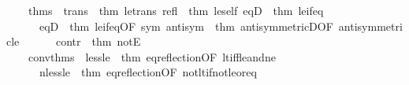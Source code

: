 \begin{isabellebody}
\ \ \ \ thms\ {\isacharequal}{\kern0pt}\ {\isacharbraceleft}{\kern0pt}trans\ {\isacharequal}{\kern0pt}\ {\isacharat}{\kern0pt}{\isacharbraceleft}{\kern0pt}thm\ le{\isacharunderscore}{\kern0pt}trans{\isacharbraceright}{\kern0pt}{\isacharcomma}{\kern0pt}\ refl\ {\isacharequal}{\kern0pt}\ {\isacharat}{\kern0pt}{\isacharbraceleft}{\kern0pt}thm\ le{\isacharunderscore}{\kern0pt}self{\isacharbraceright}{\kern0pt}{\isacharcomma}{\kern0pt}\ eqD{}\ {\isacharequal}{\kern0pt}\ {\isacharat}{\kern0pt}{\isacharbraceleft}{\kern0pt}thm\ le{\isacharunderscore}{\kern0pt}if{\isacharunderscore}{\kern0pt}eq{\isacharbraceright}{\kern0pt}{\isacharcomma}{\kern0pt}\isanewline
\ \ \ \ \ \ eqD{}\ {\isacharequal}{\kern0pt}\ {\isacharat}{\kern0pt}{\isacharbraceleft}{\kern0pt}thm\ le{\isacharunderscore}{\kern0pt}if{\isacharunderscore}{\kern0pt}eq{\isacharbrackleft}{\kern0pt}OF\ sym{\isacharbrackright}{\kern0pt}{\isacharbraceright}{\kern0pt}{\isacharcomma}{\kern0pt}\ antisym\ {\isacharequal}{\kern0pt}\ {\isacharat}{\kern0pt}{\isacharbraceleft}{\kern0pt}thm\ antisymmetricD{\isacharbrackleft}{\kern0pt}OF\ antisymmetric{\isacharunderscore}{\kern0pt}le{\isacharbrackright}{\kern0pt}{\isacharbraceright}{\kern0pt}{\isacharcomma}{\kern0pt}\isanewline
\ \ \ \ \ \ contr\ {\isacharequal}{\kern0pt}\ {\isacharat}{\kern0pt}{\isacharbraceleft}{\kern0pt}thm\ notE{\isacharbraceright}{\kern0pt}{\isacharbraceright}{\kern0pt}{\isacharcomma}{\kern0pt}\isanewline
\ \ \ \ conv{\isacharunderscore}{\kern0pt}thms\ {\isacharequal}{\kern0pt}\ {\isacharbraceleft}{\kern0pt}less{\isacharunderscore}{\kern0pt}le\ {\isacharequal}{\kern0pt}\ {\isacharat}{\kern0pt}{\isacharbraceleft}{\kern0pt}thm\ eq{\isacharunderscore}{\kern0pt}reflection{\isacharbrackleft}{\kern0pt}OF\ lt{\isacharunderscore}{\kern0pt}iff{\isacharunderscore}{\kern0pt}le{\isacharunderscore}{\kern0pt}and{\isacharunderscore}{\kern0pt}ne{\isacharbrackright}{\kern0pt}{\isacharbraceright}{\kern0pt}{\isacharcomma}{\kern0pt}\isanewline
\ \ \ \ \ \ nless{\isacharunderscore}{\kern0pt}le\ {\isacharequal}{\kern0pt}\ {\isacharat}{\kern0pt}{\isacharbraceleft}{\kern0pt}thm\ eq{\isacharunderscore}{\kern0pt}reflection{\isacharbrackleft}{\kern0pt}OF\ not{\isacharunderscore}{\kern0pt}lt{\isacharunderscore}{\kern0pt}if{\isacharunderscore}{\kern0pt}not{\isacharunderscore}{\kern0pt}le{\isacharunderscore}{\kern0pt}or{\isacharunderscore}{\kern0pt}eq{\isacharbrackright}{\kern0pt}{\isacharbraceright}{\kern0pt}{\isacharbraceright}{\kern0pt}\isanewline
\ \ {\isacharbraceright}{\kern0pt}\isanewline
{\isacartoucheclose}%
\endisatagML
{\isafoldML}%
%
\isadelimML
%
\endisadelimML
\isanewline
%
\isadelimtheory
\isanewline
%
\endisadelimtheory
%
\isatagtheory
{}\isamarkupfalse%
%
\endisatagtheory
{\isafoldtheory}%
%
\isadelimtheory
%
\endisadelimtheory
%
\end{isabellebody}%
